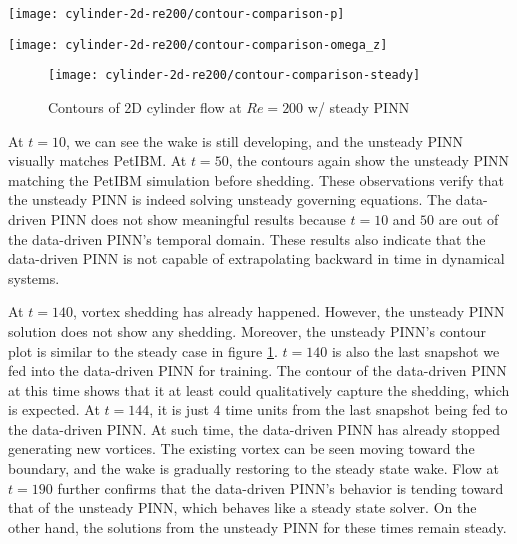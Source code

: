 \begin{figure*}
    \centering%
    \texttt{[image: cylinder-2d-re200/contour-comparison-p]}%
    \caption{%
        Pressure comparison of 2D cylinder flow of $Re=\num{200}$ between PetIBM, unsteady PINN, and data-driven PINN.
    }
    \label{fig:cylinder-re200-pinn-contours-p}%
\end{figure*}

\begin{figure*}
    \centering%
    \texttt{[image: cylinder-2d-re200/contour-comparison-omega\_z]}%
    \caption{%
        Vorticity ($\omega_z$) comparison of 2D cylinder flow of $Re=\num{200}$ between PetIBM, unsteady PINN, and data-driven PINN.
    }
    \label{fig:cylinder-re200-pinn-contours-omega_z}%
\end{figure*}

\begin{figure}
    \centering%
    \texttt{[image: cylinder-2d-re200/contour-comparison-steady]}%
    \caption{%
        Contours of 2D cylinder flow at $Re=\num{200}$ w/ steady PINN
    }
    \label{fig:cylinder-re200-steady-pinn-contours}%
\end{figure}

At $t=10$, we can see the wake is still developing, and the unsteady PINN visually matches PetIBM.
At $t=50$, the contours again show the unsteady PINN matching the PetIBM simulation before shedding.
These observations verify that the unsteady PINN is indeed solving unsteady governing equations.
The data-driven PINN does not show meaningful results because $t=10$ and $50$ are out of the data-driven PINN's temporal domain.
These results also indicate that the data-driven PINN is not capable of extrapolating backward in time in dynamical systems.

At $t=140$, vortex shedding has already happened.
However, the unsteady PINN solution does not show any shedding.
Moreover, the unsteady PINN's contour plot is similar to the steady case in figure \ref{fig:cylinder-re200-steady-pinn-contours}.
$t=140$ is also the last snapshot we fed into the data-driven PINN for training.
The contour of the data-driven PINN at this time shows that it at least could qualitatively capture the shedding, which is expected.
At $t=144$, it is just $4$ time units from the last snapshot being fed to the data-driven PINN.
At such time, the data-driven PINN has already stopped generating new vortices.
The existing vortex can be seen moving toward the boundary, and the wake is gradually restoring to the steady state wake.
Flow at $t=190$ further confirms that the data-driven PINN's behavior is tending toward that of the unsteady PINN, which behaves like a steady state solver.
On the other hand, the solutions from the unsteady PINN for these times remain steady.

